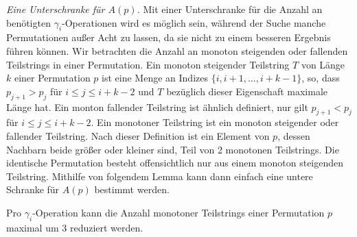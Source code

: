 \documentclass[a4paper, 11pt, ngerman]{article}
\begin{document}
\noindent \emph{Eine Unterschranke für $A(p)$.} Mit einer Unterschranke für die Anzahl an benötigten $\gamma_i$-Operationen wird es möglich sein, während der Suche manche Permutationen außer Acht zu lassen, da sie nicht zu einem besseren Ergebnis führen können. Wir betrachten die Anzahl an monoton steigenden oder fallenden Teilstrings in einer Permutation. Ein monoton steigender Teilstring $T$ von Länge $k$ einer Permutation $p$ ist eine Menge an Indizes $\{i, i + 1, \dots, i + k - 1\}$, so, dass $p_{j+1} > p_j$ für $i \le j \le i+ k - 2$ und $T$ bezüglich dieser Eigenschaft maximale Länge hat. Ein monton fallender Teilstring ist ähnlich definiert, nur gilt $p_{j + 1} < p_j$ für $i \le j \le i + k - 2$. Ein monotoner Teilstring ist ein monoton steigender oder fallender Teilstring. Nach dieser Definition ist ein Element von $p$, dessen Nachbarn beide größer oder kleiner sind, Teil von 2 monotonen Teilstrings. Die identische Permutation besteht offensichtlich nur aus einem monoton steigenden Teilstring. Mithilfe von folgendem Lemma kann dann einfach eine untere Schranke für $A(p)$ bestimmt werden.

\begin{lemma}
    Pro $\gamma_i$-Operation kann die Anzahl monotoner Teilstrings einer Permutation $p$ maximal um 3 reduziert werden.
\end{lemma}
\end{document}
